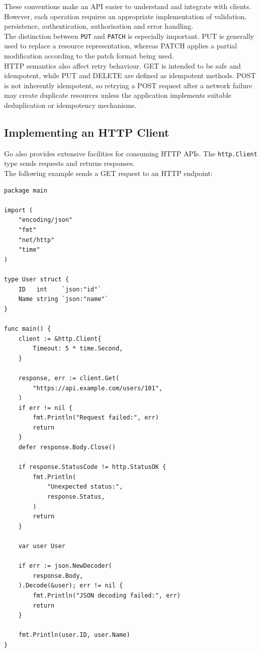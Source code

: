 These conventions make an API easier to understand and integrate with clients. However, each operation requires an appropriate implementation of validation, persistence, authentication, authorisation and error handling.\\

The distinction between \texttt{PUT} and \texttt{PATCH} is especially important. PUT is generally used to replace a resource representation, whereas PATCH applies a partial modification according to the patch format being used.\\

HTTP semantics also affect retry behaviour. GET is intended to be safe and idempotent, while PUT and DELETE are defined as idempotent methods. POST is not inherently idempotent, so retrying a POST request after a network failure may create duplicate resources unless the application implements suitable deduplication or idempotency mechanisms.

\subsection{Implementing an HTTP Client}

Go also provides extensive facilities for consuming HTTP APIs. The \texttt{http.Client} type sends requests and returns responses.\\

The following example sends a GET request to an HTTP endpoint:

\begin{lstlisting}
package main

import (
    "encoding/json"
    "fmt"
    "net/http"
    "time"
)

type User struct {
    ID   int    `json:"id"`
    Name string `json:"name"`
}

func main() {
    client := &http.Client{
        Timeout: 5 * time.Second,
    }

    response, err := client.Get(
        "https://api.example.com/users/101",
    )
    if err != nil {
        fmt.Println("Request failed:", err)
        return
    }
    defer response.Body.Close()

    if response.StatusCode != http.StatusOK {
        fmt.Println(
            "Unexpected status:",
            response.Status,
        )
        return
    }

    var user User

    if err := json.NewDecoder(
        response.Body,
    ).Decode(&user); err != nil {
        fmt.Println("JSON decoding failed:", err)
        return
    }

    fmt.Println(user.ID, user.Name)
}
\end{lstlisting}

